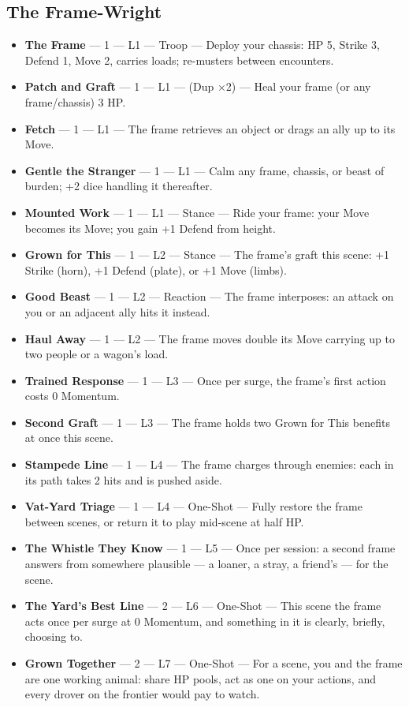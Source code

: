 \subsection{The Frame-Wright}
\begin{itemize}
    \item \textbf{The Frame} --- 1 --- L1 --- Troop --- Deploy your chassis: HP 5, Strike 3, Defend 1, Move 2, carries loads; re-musters between encounters.
    \item \textbf{Patch and Graft} --- 1 --- L1 --- (Dup ×2) --- Heal your frame (or any frame/chassis) 3 HP.
    \item \textbf{Fetch} --- 1 --- L1 --- The frame retrieves an object or drags an ally up to its Move.
    \item \textbf{Gentle the Stranger} --- 1 --- L1 --- Calm any frame, chassis, or beast of burden; +2 dice handling it thereafter.
    \item \textbf{Mounted Work} --- 1 --- L1 --- Stance --- Ride your frame: your Move becomes its Move; you gain +1 Defend from height.
    \item \textbf{Grown for This} --- 1 --- L2 --- Stance --- The frame's graft this scene: +1 Strike (horn), +1 Defend (plate), or +1 Move (limbs).
    \item \textbf{Good Beast} --- 1 --- L2 --- Reaction --- The frame interposes: an attack on you or an adjacent ally hits it instead.
    \item \textbf{Haul Away} --- 1 --- L2 --- The frame moves double its Move carrying up to two people or a wagon's load.
    \item \textbf{Trained Response} --- 1 --- L3 --- Once per surge, the frame's first action costs 0 Momentum.
    \item \textbf{Second Graft} --- 1 --- L3 --- The frame holds two Grown for This benefits at once this scene.
    \item \textbf{Stampede Line} --- 1 --- L4 --- The frame charges through enemies: each in its path takes 2 hits and is pushed aside.
    \item \textbf{Vat-Yard Triage} --- 1 --- L4 --- One-Shot --- Fully restore the frame between scenes, or return it to play mid-scene at half HP.
    \item \textbf{The Whistle They Know} --- 1 --- L5 --- Once per session: a second frame answers from somewhere plausible --- a loaner, a stray, a friend's --- for the scene.
    \item \textbf{The Yard's Best Line} --- 2 --- L6 --- One-Shot --- This scene the frame acts once per surge at 0 Momentum, and something in it is clearly, briefly, choosing to.
    \item \textbf{Grown Together} --- 2 --- L7 --- One-Shot --- For a scene, you and the frame are one working animal: share HP pools, act as one on your actions, and every drover on the frontier would pay to watch.
\end{itemize}

